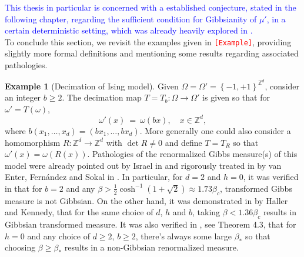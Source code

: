 \documentclass[12pt]{article}
\newcommand{\Z}{\mathbb{Z}}
\newcommand{\set}[1]{\left\{#1\right\}}
\newcommand{\ra}{\rightarrow}
\newcommand{\1}{\mathbbm{1}}
\newcommand{\5}{\vspace{0.5cm}}
\theoremstyle{definition}
\newtheorem{ex}[thm]{Example}
\begin{document}
\textcolor{blue}{This thesis in particular is concerned with a established conjecture, stated in the following chapter, regarding the sufficient condition for Gibbsianity of $\mu'$, in a certain deterministic setting, which was already heavily explored in \cite{Ber}.} \\

To conclude this section, we revisit the examples given in \textcolor{red}{\texttt{[Example]}}, providing slightly more formal definitions and mentioning some results regarding associated pathologies.

\begin{ex}[Decimation of Ising model]
Given $\Omega=\Omega'=\set{-1,+1}^{\Z^d}$, consider an integer $b\geq 2$. The decimation map $T=T_b:\Omega\ra\Omega'$ is given so that for $\omega'=T(\omega)$,
$$\omega'(x) ~=~ \omega(bx), \quad x\in\Z^d,$$
where $b(x_1,\ldots,x_d)=(bx_1,\ldots,bx_d)$. More generally one could also consider a homomorphism $R:\Z^d\ra\Z^d$ with $\det R\neq 0$ and define $T=T_R$ so that $\omega'(x)=\omega(R(x))$. Pathologies of the renormalized Gibbs measure(s) of  this model were already pointed out by Israel in \cite{Isr} and rigorously treated in by van Enter, Fern\'andez and Sokal in \cite{EFS}. In particular, for $d=2$ and $h=0$, it was verified in \cite{EFS} that for $b=2$ and any $\beta>\frac{1}{2}\cosh^{-1}(1+\sqrt{2})\approx 1.73\beta_c$, transformed Gibbs measure is not Gibbsian. On the other hand, it was demonstrated in \cite{HK} by Haller and Kennedy, that for the same choice of $d$, $h$ and $b$, taking $\beta<1.36\beta_c$ results in Gibbsian transformed measure. It was also verified in \cite{EFS}, see Theorem 4.3, that for $h=0$ and any choice of $d\geq 2$, $b\geq 2$, there's always some large $\beta_*$ so that choosing $\beta\geq \beta_*$ results in a non-Gibbsian renormalized measure.
\end{ex}
\end{document}
